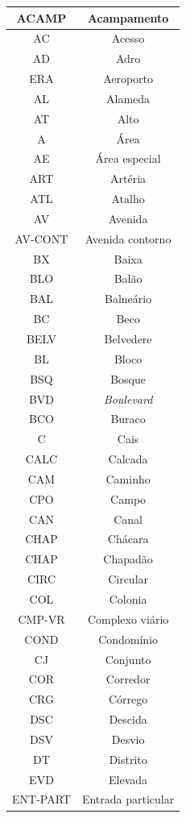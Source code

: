 \documentclass[
	12pt,				%
	oneside,			%
	a4paper,			%
	english,			%
	brazil				%
	]{abntex2ppgsi}
\begin{document}
{{\begin{apendicesenv}
\begin{longtable}{c|c}
\hline
ACAMP & Acampamento \\
\hline
AC & Acesso \\
\hline
AD & Adro \\
\hline
ERA & Aeroporto \\
\hline
AL & Alameda \\
\hline
AT & Alto \\
\hline
A & Área \\
\hline
AE & Área especial \\
\hline
ART & Artéria \\
\hline
ATL & Atalho \\
\hline
AV & Avenida \\
\hline
AV-CONT & Avenida contorno \\
\hline
BX & Baixa \\
\hline
BLO & Balão \\
\hline
BAL & Balneário \\
\hline
BC & Beco \\
\hline
BELV & Belvedere \\
\hline
BL & Bloco \\
\hline
BSQ & Bosque \\
\hline
BVD & \textit{Boulevard} \\
\hline
BCO & Buraco \\
\hline
C & Cais \\
\hline
CALC & Calcada \\
\hline
CAM & Caminho \\
\hline
CPO & Campo \\
\hline
CAN & Canal \\
\hline
CHAP & Chácara \\
\hline
CHAP & Chapadão \\
\hline
CIRC & Circular \\
\hline
COL & Colonia \\
\hline
CMP-VR & Complexo viário \\
\hline
COND & Condomínio \\
\hline
CJ & Conjunto \\
\hline
COR & Corredor \\
\hline
CRG & Córrego \\
\hline
DSC & Descida \\
\hline
DSV & Desvio \\
\hline
DT & Distrito \\
\hline
EVD & Elevada \\
\hline
ENT-PART & Entrada particular \\
\hline

\end{longtable}
\end{apendicesenv}}}
\end{document}
